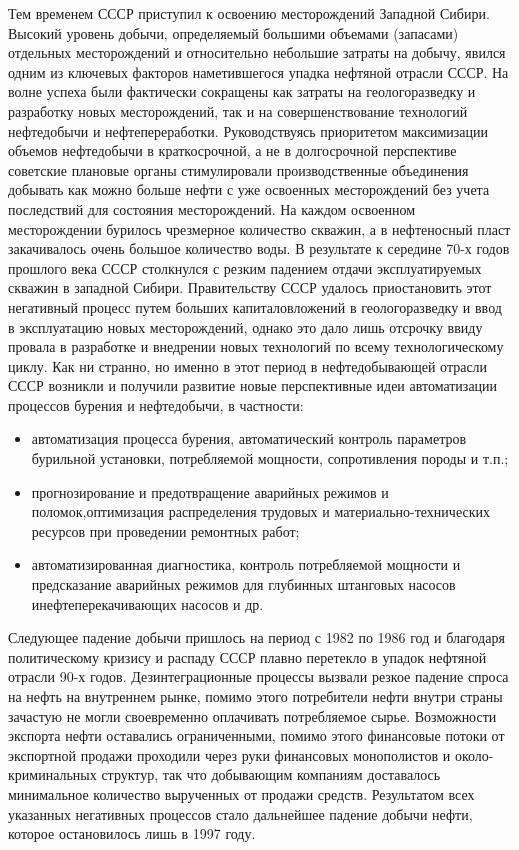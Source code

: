 Тем временем СССР приступил к освоению месторождений Западной Сибири.
Высокий уровень добычи, определяемый большими объемами (запасами) отдельных месторождений и относительно небольшие затраты на добычу, явился одним из ключевых факторов наметившегося упадка нефтяной отрасли СССР.
На волне успеха были фактически сокращены как затраты на геологоразведку и разработку новых месторождений, так и на совершенствование технологий нефтедобычи и нефтепереработки.
Руководствуясь приоритетом максимизации объемов нефтедобычи в краткосрочной, а не в долгосрочной перспективе советские плановые органы стимулировали производственные объединения добывать как можно больше нефти с уже освоенных месторождений без учета последствий для состояния месторождений.
На каждом освоенном месторождении бурилось чрезмерное количество скважин, а в нефтеносный пласт закачивалось очень большое количество воды.
В результате к середине 70-х годов прошлого века СССР столкнулся с резким падением отдачи эксплуатируемых скважин в западной Сибири.
Правительству СССР удалось приостановить этот негативный процесс путем больших капиталовложений в геологоразведку и ввод в эксплуатацию новых месторождений, однако это дало лишь отсрочку ввиду провала в разработке и внедрении новых технологий по всему технологическому циклу.
Как ни странно, но именно в этот период в нефтедобывающей отрасли СССР возникли и получили развитие новые перспективные идеи автоматизации процессов бурения и нефтедобычи, в частности:  
\begin{itemize} 
	\tightlist 
	\item автоматизация процесса бурения, автоматический контроль параметров бурильной установки, потребляемой мощности, сопротивления породы и т.п.;
	\item прогнозирование и предотвращение аварийных режимов и поломок,оптимизация распределения трудовых и материально-технических ресурсов при проведении ремонтных работ; 
	\item автоматизированная диагностика, контроль потребляемой мощности и предсказание аварийных режимов для глубинных штанговых насосов инефтеперекачивающих насосов и др.
\end{itemize}  

Следующее падение добычи пришлось на период с 1982 по 1986 год и благодаря политическому кризису и распаду СССР плавно перетекло в упадок нефтяной отрасли 90-х годов.
Дезинтеграционные процессы вызвали резкое падение спроса на нефть на внутреннем рынке, помимо этого потребители нефти внутри страны зачастую не могли своевременно оплачивать потребляемое сырье.
Возможности экспорта нефти оставались ограниченными, помимо этого финансовые потоки от экспортной продажи проходили через руки финансовых монополистов и около-криминальных структур, так что добывающим компаниям доставалось минимальное количество вырученных от продажи средств.
Результатом всех указанных негативных процессов стало дальнейшее падение добычи нефти, которое остановилось лишь в 1997 году.

